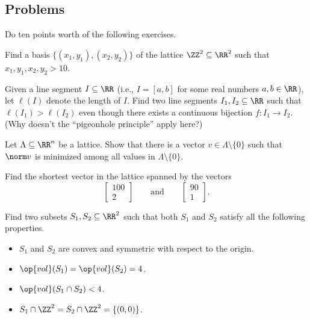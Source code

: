 \documentclass[../notes.tex]{subfiles}
\begin{document}
\subsection{Problems}
Do ten points worth of the following exercises.
\begin{prob}[1 point]
	Find a basis $\{(x_1,y_1),(x_2,y_2)\}$ of the lattice $\ZZ^2\subseteq\RR^2$ such that $x_1,y_1,x_2,y_2>10$.
\end{prob}
\begin{prob}[1 point]
	Given a line segment $I\subseteq\RR$ (i.e., $I=[a,b]$ for some real numbers $a,b\in\RR$), let $\ell(I)$ denote the length of $I$. Find two line segments $I_1,I_2\subseteq\RR$ such that $\ell(I_1)>\ell(I_2)$ even though there exists a continuous bijection $f\colon I_1\to I_2$. (Why doesn't the ``pigeonhole principle'' apply here?)
\end{prob}
\begin{prob}[2 points]
	Let $\Lambda\subseteq\RR^n$ be a lattice. Show that there is a vector $v\in\Lambda\setminus\{0\}$ such that $\norm v$ is minimized among all values in $\Lambda\setminus\{0\}$.
\end{prob}
\begin{prob}[3 points]
	Find the shortest vector in the lattice spanned by the vectors
	\[\begin{bmatrix}
		100 \\
		2
	\end{bmatrix}\qquad\text{and}\qquad\begin{bmatrix}
		90 \\
		1
	\end{bmatrix}.\]
\end{prob}
\begin{prob}[3 points]
	Find two subsets $S_1,S_2\subseteq\RR^2$ such that both $S_1$ and $S_2$ satisfy all the following properties.
	\begin{itemize}
		\item $S_1$ and $S_2$ are convex and symmetric with respect to the origin.
		\item $\op{vol}(S_1)=\op{vol}(S_2)=4$.
		\item $\op{vol}(S_1\cap S_2)<4$.
		\item $S_1\cap\ZZ^2=S_2\cap\ZZ^2=\{(0,0)\}$.
	\end{itemize}
\end{prob}
\end{document}
